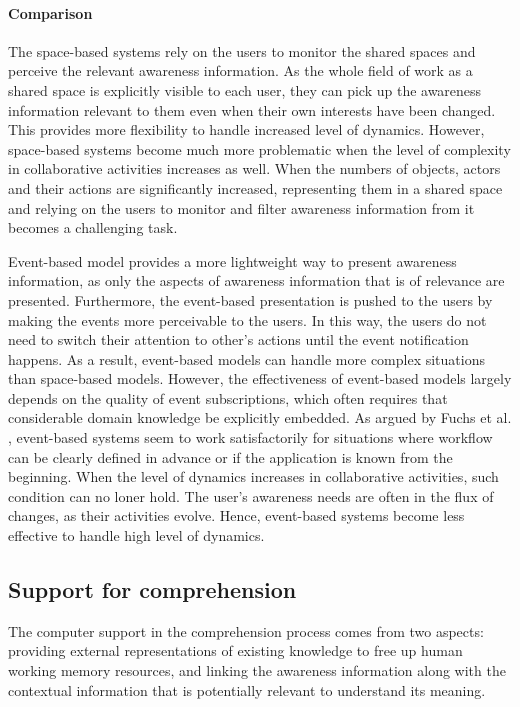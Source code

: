 \paragraph*{Comparison} %
\label{par:comparison}
The space-based systems rely on the users to monitor the shared spaces and perceive the relevant awareness information. As the whole field of work as a shared space is explicitly visible to each user, they can pick up the awareness information relevant to them even when their own interests have been changed. This provides more flexibility to handle increased level of dynamics. However, space-based systems become much more problematic when the level of complexity in collaborative activities increases as well. When the numbers of objects, actors and their actions are significantly increased, representing them in a shared space and relying on the users to monitor and filter awareness information from it becomes a challenging task.

Event-based model provides a more lightweight way to present awareness information, as only the aspects of awareness information that is of relevance are presented. Furthermore, the event-based presentation is pushed to the users by making the events more perceivable to the users. In this way, the users do not need to switch their attention to other's actions until the event notification happens. As a result, event-based models can handle more complex situations than space-based models. However, the effectiveness of event-based models largely depends on the quality of event subscriptions, which often requires that considerable domain knowledge be explicitly embedded. As argued by Fuchs et al. \cite{fuchs1999a}, event-based systems seem to work satisfactorily for situations where workflow can be clearly defined in advance or if the application is known from the beginning. When the level of dynamics increases in collaborative activities, such condition can no loner hold. The user's awareness needs are often in the flux of changes, as their activities evolve. Hence, event-based systems become less effective to handle high level of dynamics.

\subsection{Support for comprehension} %
\label{ssub:support_for_comprehension}
The computer support in the comprehension process comes from two aspects: providing external representations of existing knowledge to free up human working memory resources, and linking the awareness information along with the contextual information that is potentially relevant to understand its meaning.

